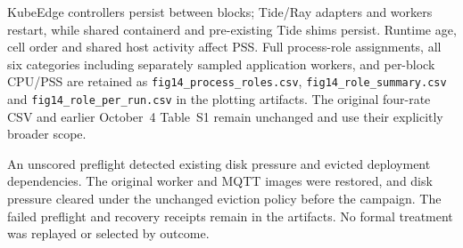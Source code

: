 KubeEdge controllers persist between blocks; Tide/Ray adapters and workers restart, while shared containerd and pre-existing Tide shims persist. Runtime age, cell order and shared host activity affect PSS. Full process-role assignments, all six categories including separately sampled application workers, and per-block CPU/PSS are retained as \texttt{fig14\_process\_roles.csv}, \texttt{fig14\_role\_summary.csv} and \texttt{fig14\_role\_per\_run.csv} in the plotting artifacts. The original four-rate CSV and earlier October~4 Table~S1 remain unchanged and use their explicitly broader scope.

An unscored preflight detected existing disk pressure and evicted deployment dependencies. The original worker and MQTT images were restored, and disk pressure cleared under the unchanged eviction policy before the campaign. The failed preflight and recovery receipts remain in the artifacts. No formal treatment was replayed or selected by outcome.
